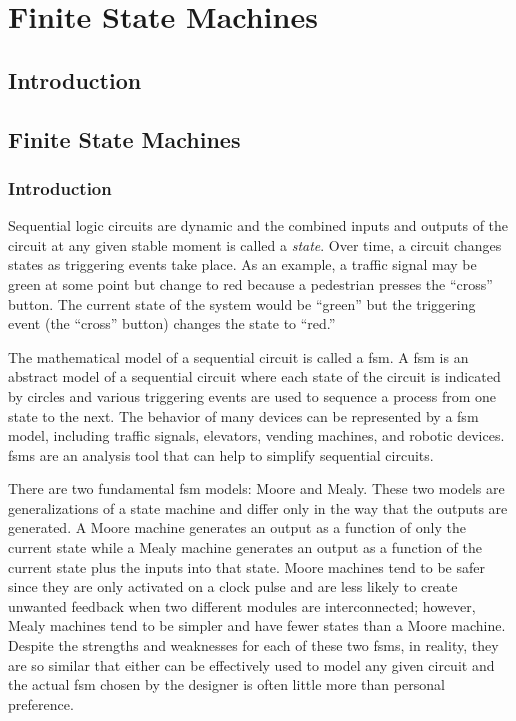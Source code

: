 \chapter{Finite State Machines}\label{ch12}
\section{Introduction}


\section{Finite State Machines}
\label{SIM:sec:finite_state_machines}

\subsection{Introduction}
\label{SIM:subsec:intro_to_finite_state_machines}

Sequential logic circuits are dynamic and the combined inputs and outputs of the circuit at any given stable moment is called a \emph{state}. Over time, a circuit changes states as triggering events take place. As an example, a traffic signal may be green at some point but change to red because a pedestrian presses the  ``cross'' button. The current state of the system would be ``green'' but the triggering event (the ``cross'' button) changes the state to ``red.'' 

The mathematical model of a sequential circuit is called a \gls{fsm}. A \gls{fsm} is an abstract model of a sequential circuit where each state of the circuit is indicated by circles and various triggering events are used to sequence a process from one state to the next. The behavior of many devices can be represented by a \gls{fsm} model, including traffic signals, elevators, vending machines, and robotic devices. \glspl{fsm} are an analysis tool that can help to simplify sequential circuits. 

There are two fundamental \gls{fsm} models: Moore and Mealy. These two models are generalizations of a state machine and differ only in the way that the outputs are generated. A Moore machine generates an output as a function of only the current state while a Mealy machine generates an output as a function of the current state plus the inputs into that state. Moore machines tend to be safer since they are only activated on a clock pulse and are less likely to create unwanted feedback when two different modules are interconnected; however, Mealy machines tend to be simpler and have fewer states than a Moore machine. Despite the strengths and weaknesses for each of these two \glspl{fsm}, in reality, they are so similar that either can be effectively used to model any given circuit and the actual \gls{fsm} chosen by the designer is often little more than personal preference. 

